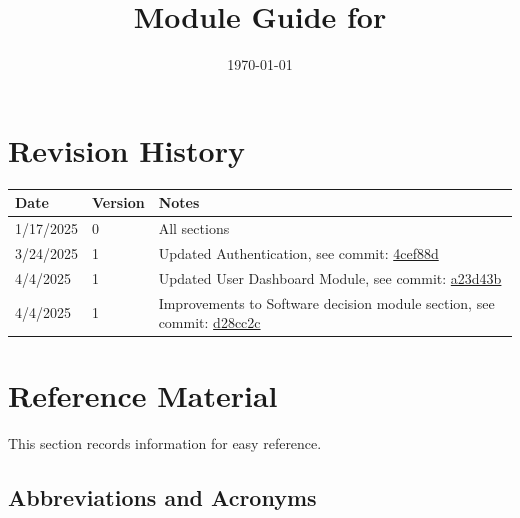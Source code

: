 \documentclass[12pt, titlepage]{article}
\begin{document}
\title{Module Guide for \progname{}} 
\author{\authname}
\date{\today}

\maketitle


\section{Revision History}

\begin{tabularx}{\textwidth}{p{3cm}p{2cm}X}
\toprule {\bf Date} & {\bf Version} & {\bf Notes}\\
\midrule
1/17/2025 & 0 & All sections\\
3/24/2025 & 1 & Updated Authentication, see commit: \href{https://github.com/ausbennett/mes-finance-platform/commit/4cef88de4d7c2a664fa8e2395804251c0a6baeb4}{4cef88d}\\
4/4/2025 & 1 & Updated User Dashboard Module, see commit: \href{https://github.com/ausbennett/mes-finance-platform/commit/a23d43b84b1426d0f6a8d13d3120043a0d8c54b3}{a23d43b}\\
4/4/2025 & 1 & Improvements to Software decision module section, see commit: \href{https://github.com/ausbennett/mes-finance-platform/commit/d28cc2c30433566afcd2b0621950a5832a6cc40e}{d28cc2c}\\
\bottomrule
\end{tabularx}

\newpage

\section{Reference Material}

This section records information for easy reference.

\subsection{Abbreviations and Acronyms}

\renewcommand{\arraystretch}{1.2}
\end{document}
